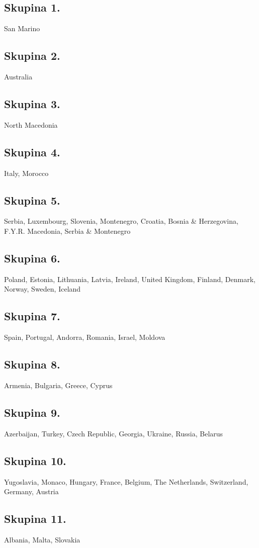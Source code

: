 \documentclass[a4paper,11pt]{article}
\begin{document}
\subsection{Skupina 1.}
San Marino
\subsection{Skupina 2.}
Australia
\subsection{Skupina 3.}
North Macedonia
\subsection{Skupina 4.}
Italy, Morocco
\subsection{Skupina 5.}
Serbia, Luxembourg, Slovenia, Montenegro, Croatia, Bosnia & Herzegovina, F.Y.R. Macedonia, Serbia \& Montenegro
\subsection{Skupina 6.}
Poland, Estonia, Lithuania, Latvia, Ireland, United Kingdom, Finland, Denmark, Norway, Sweden, Iceland
\subsection{Skupina 7.}
Spain, Portugal, Andorra, Romania, Israel, Moldova
\subsection{Skupina 8.}
Armenia, Bulgaria, Greece, Cyprus
\subsection{Skupina 9.}
Azerbaijan, Turkey, Czech Republic, Georgia, Ukraine, Russia, Belarus
\subsection{Skupina 10.}
Yugoslavia, Monaco, Hungary, France, Belgium, The Netherlands, Switzerland, Germany, Austria
\subsection{Skupina 11.}
Albania, Malta, Slovakia
\newpage
\end{document}
